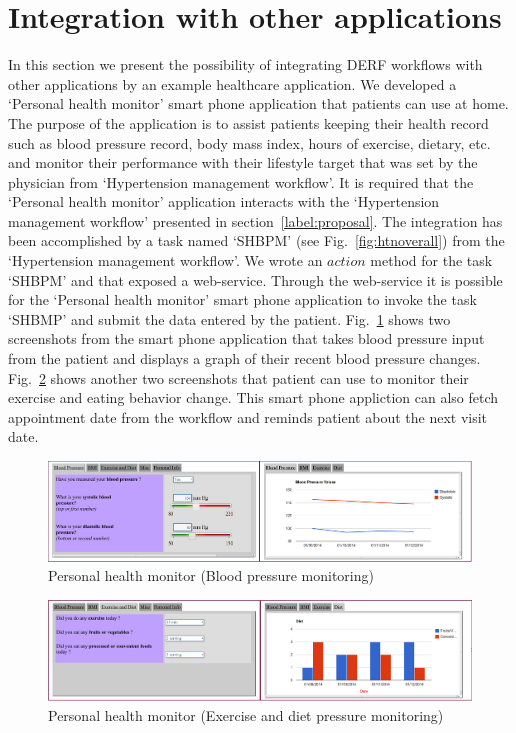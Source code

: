\documentclass[a4paper]{llncs}
\begin{document}
\section{Integration with other applications}\label{label:phm}
In this section we present the possibility of integrating DERF workflows with other applications by an example healthcare application. 
We developed a `Personal health monitor' smart phone application that patients can use at home. 
The purpose of the application is to assist patients keeping their health record such as blood pressure record, body mass index, hours of exercise, dietary, etc. 
and monitor their performance with their lifestyle target that was set by the physician from `Hypertension management workflow'. 
It is required that the `Personal health monitor' application interacts with the `Hypertension management workflow' presented in section~\ref{label:proposal}. 
The integration has been accomplished by a task named `SHBPM' (see Fig.~\ref{fig:htnoverall}) from the `Hypertension management workflow'. 
We wrote an $action$ method for the task `SHBPM' and that exposed a web-service. 
Through the web-service it is possible for the `Personal health monitor' smart phone application to invoke the task `SHBMP' and submit the data entered by the patient. 
Fig.~\ref{fig:bp_phm} shows two screenshots from the smart phone application that takes blood pressure input from the patient and displays a graph of their recent blood pressure changes. 
Fig.~\ref{fig:diet_phm} shows another two screenshots that patient can use to monitor their exercise and eating behavior change. 
This smart phone appliction can also fetch appointment date from the workflow and reminds patient about the next visit date. 


\begin{figure}
  \begin{center}
    \includegraphics[width=\textwidth]{bp_phm.png}
    \caption{Personal health monitor (Blood pressure monitoring)}
    \label{fig:bp_phm}
  \end{center}
\end{figure}

\begin{figure}
  \begin{center}
    \includegraphics[width=\textwidth]{diet_phm.png}
    \caption{Personal health monitor (Exercise and diet pressure monitoring)}
    \label{fig:diet_phm}
  \end{center}
\end{figure}
\end{document}
